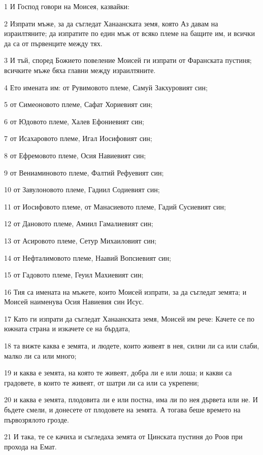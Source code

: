 \par 1 И Господ говори на Моисея, казвайки:
\par 2 Изпрати мъже, за да съгледат Ханаанската земя, която Аз давам на израилтяните; да изпратите по един мъж от всяко племе на бащите им, и всички да са от първенците между тях.
\par 3 И тъй, според Божието повеление Моисей ги изпрати от Фаранската пустиня; всичките мъже бяха главни между израилтяните.
\par 4 Ето имената им: от Рувимовото племе, Самуй Закхуровият син;
\par 5 от Симеоновото племе, Сафат Хориевият син;
\par 6 от Юдовото племе, Халев Ефониевият син;
\par 7 от Исахаровото племе, Игал Иосифовият син;
\par 8 от Ефремовото племе, Осия Навиевият син;
\par 9 от Вениаминовото племе, Фалтий Рефуевият син;
\par 10 от Завулоновото племе, Гадиил Содиевият син;
\par 11 от Иосифовото племе, от Манасиевото племе, Гадий Сусиевият син;
\par 12 от Дановото племе, Амиил Гамалиевият син;
\par 13 от Асировото племе, Сетур Михаиловият син;
\par 14 от Нефталимовото племе, Наавий Вопсиевият син;
\par 15 от Гадовото племе, Геуил Махиевият син;
\par 16 Тия са имената на мъжете, които Моисей изпрати, за да съгледат земята; и Моисей наименува Осия Навиевия син Исус.
\par 17 Като ги изпрати да съгледат Ханаанската земя, Моисей им рече: Качете се по южната страна и изкачете се на бърдата,
\par 18 та вижте каква е земята, и людете, които живеят в нея, силни ли са или слаби, малко ли са или много;
\par 19 и каква е земята, на която те живеят, добра ли е или лоша; и какви са градовете, в които те живеят, от шатри ли са или са укрепени;
\par 20 и каква е земята, плодовита ли е или постна, има ли по нея дървета или не. И бъдете смели, и донесете от плодовете на земята. А тогава беше времето на първозрялото грозде.
\par 21 И така, те се качиха и съгледаха земята от Цинската пустиня до Роов при прохода на Емат.
